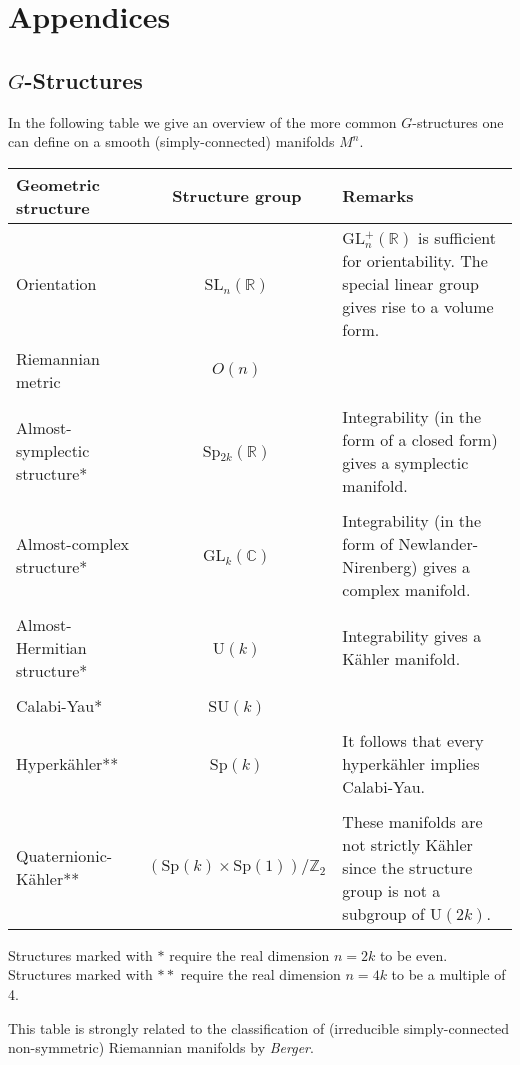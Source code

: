 \documentclass[11pt, a4paper]{report}
\begin{document}
\part{Appendices}
\begin{appendices}

\chapter{\texorpdfstring{$G$-Structures}{G-Structures}}
	In the following table we give an overview of the more common $G$-structures one can define on a smooth (simply-connected) manifolds $M^n$.
	\begin{center}
		\begin{tabularx}{\textwidth}{|l|c|X|}
			 \hline
			 	Geometric structure&Structure group&Remarks\\
			 \hline
			 	Orientation&SL$_n(\mathbb{R})$&GL$^+_n(\mathbb{R})$ is sufficient for orientability. The special linear group gives rise to a volume form.\\
			 	Riemannian metric&$O(n)$&\\&&\\
			 	Almost-symplectic structure*&Sp$_{2k}(\mathbb{R})$&Integrability (in the form of a closed form) gives a symplectic manifold.\\&&\\
			 	Almost-complex structure*&GL$_k(\mathbb{C})$&Integrability (in the form of Newlander-Nirenberg) gives a complex manifold.\\&&\\
			 	Almost-Hermitian structure*&U$(k)$&Integrability gives a K\"ahler manifold.\\&&\\
			 	Calabi-Yau*&SU$(k)$&\\&&\\
			 	Hyperk\"ahler**&Sp$(k)$&It follows that every hyperk\"ahler implies Calabi-Yau.\\&&\\
			 	Quaternionic-K\"ahler**\footnotemark&$(\text{Sp}(k)\times\text{Sp}(1))/\mathbb{Z}_2$&These manifolds are not strictly K\"ahler since the structure group is not a subgroup of U$(2k)$.\\
			 \hline
		\end{tabularx}
	\end{center}
	Structures marked with $\ast$ require the real dimension $n=2k$ to be even. Structures marked with $\ast\ast$ require the real dimension $n=4k$ to be a multiple of 4.
	
	\begin{remark*}
		This table is strongly related to the classification of (irreducible simply-connected non-symmetric) Riemannian manifolds by \textit{Berger}.
	\end{remark*}


\end{appendices}
\end{document}
